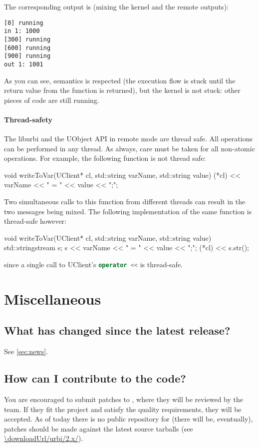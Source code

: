 The corresponding output is (mixing the kernel and the remote outputs):

\begin{lstlisting}
[0] running
in 1: 1000
[300] running
[600] running
[900] running
out 1: 1001
\end{lstlisting}

As you can see, \urbi semantics is respected (the execution flow is
stuck until the return value from the function is returned), but the
kernel is not stuck: other pieces of code are still running.

\paragraph{Thread-safety}

The liburbi and the UObject API in remote mode are thread safe. All
operations can be performed in any thread. As always, care must be
taken for all non-atomic operations. For example, the following
function is not thread safe:

\begin{cxx}
void
writeToVar(UClient* cl, std::string varName, std::string value)
{
  (*cl) << varName << " = " << value << ";";
}
\end{cxx}

Two simultaneous calls to this function from different threads can
result in the two messages being mixed.  The following implementation
of the same function is thread-safe however:

\begin{cxx}
void
writeToVar(UClient* cl, std::string varName, std::string value)
{
  std::stringstream s;
  s << varName << " = " << value << ";";
  (*cl) << s.str();
}
\end{cxx}

\noindent
since a single call to UClient's \lstinline[language=C++]|operator <<|
is thread-safe.


\section{Miscellaneous}
\subsection{What has changed since the latest release?}
See \autoref{sec:news}.

\subsection{How can I contribute to the code?}
\label{sec:faq:contribute}
You are encouraged to submit patches to ,
where they will be reviewed by the \urbi team.  If they fit the project and
satisfy the quality requirements, they will be accepted.  As of today there
is no public repository for \usdk (there will be, eventually), patches
should be made against the latest source tarballs (see
\url{\downloadUrl/urbi/2.x/}).

